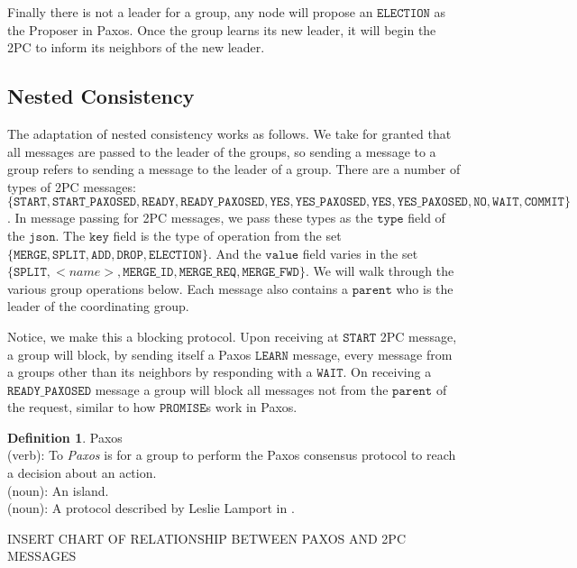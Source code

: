 \documentclass{amsart}
\theoremstyle{definition}
\newtheorem{defn}[thm]{Definition}
\theoremstyle{remark}
\numberwithin{equation}{section}
\begin{document}
Finally there is not a leader for a group, any node will propose an $\mathtt{ELECTION}$ as the Proposer in Paxos. Once the group learns its new leader, it will begin the 2PC to inform its neighbors of the new leader.
\subsection{Nested Consistency}
The adaptation of nested consistency works as follows. We take for granted that all messages are passed to the leader of the groups, so sending a message to a group refers to sending a message to the leader of a group. There are a number of types of 2PC messages: $\{ \mathtt{START}, \mathtt{START\_PAXOSED}, \mathtt{READY}, \mathtt{READY\_PAXOSED}, \mathtt{YES}, \mathtt{YES\_PAXOSED}, \mathtt{YES}, \mathtt{YES\_PAXOSED}, \mathtt{NO}, \mathtt{WAIT}, \mathtt{COMMIT} \}$. In message passing for 2PC messages, we pass these types as the $\mathtt{type}$ field of the $\mathtt{json}$. The $\mathtt{key}$ field is the type of operation from the set $\{ \mathtt{MERGE}, \mathtt{SPLIT}, \mathtt{ADD}, \mathtt{DROP}, \mathtt{ELECTION} \}$. And the $\mathtt{value}$ field varies in the set $\{ \mathtt{SPLIT}, <name>, \mathtt{MERGE\_ID}, \mathtt{MERGE\_REQ}, \mathtt{MERGE\_FWD} \}$. We will walk through the various group operations below. Each message also contains a $\mathtt{parent}$ who is the leader of the coordinating group. 

Notice, we make this a blocking protocol. Upon receiving at $\mathtt{START}$ 2PC message, a group will block, by sending itself a Paxos $\mathtt{LEARN}$ message, every message from a groups other than its neighbors by responding with a $\mathtt{WAIT}$. On receiving a $\mathtt{READY\_PAXOSED}$ message a group will block all messages not from the $\mathtt{parent}$ of the request, similar to how $\mathtt{PROMISE}$s work in Paxos.
\begin{defn}
Paxos\\
(verb): To \textit{Paxos} is for a group to perform the Paxos consensus protocol to reach a decision about an action.\\
(noun): An island. \\
(noun): A protocol described by Leslie Lamport in \cite{Paxos}.
\end{defn}

INSERT CHART OF RELATIONSHIP BETWEEN PAXOS AND 2PC MESSAGES
\end{document}
